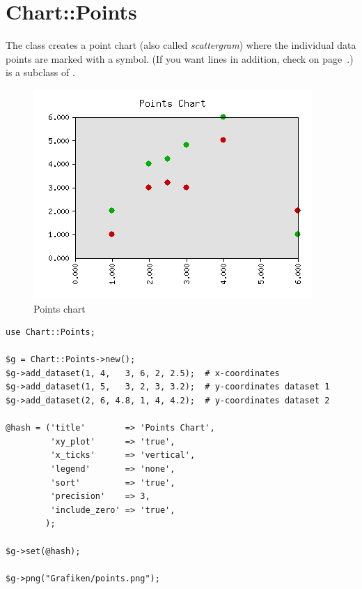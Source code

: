 %
%
\renewcommand{\thisname}{Chart::Points}
\section{\thisname}
\name{\thisname}
\begin{Description}
The class \thisclass creates a point chart (also called
\emph{scattergram}) where the individual data points are marked with a
symbol. (If you want lines in addition, check
 on page~\pageref{Chart::LinesPoints}.)
\thisclass is a subclass of .
\end{Description}

\example
\begin{figure}[ht]
  \begin{center}
    \includegraphics[scale=0.5]{points.png}
  \end{center}
  \caption{Points chart}
  \label{fig:points}
\end{figure}
\begin{verbatim}
use Chart::Points;

$g = Chart::Points->new();
$g->add_dataset(1, 4,   3, 6, 2, 2.5);  # x-coordinates
$g->add_dataset(1, 5,   3, 2, 3, 3.2);  # y-coordinates dataset 1
$g->add_dataset(2, 6, 4.8, 1, 4, 4.2);  # y-coordinates dataset 2

@hash = ('title'        => 'Points Chart',
         'xy_plot'      => 'true',
         'x_ticks'      => 'vertical',
         'legend'       => 'none',
         'sort'         => 'true',
         'precision'    => 3,
         'include_zero' => 'true',
        );

$g->set(@hash);

$g->png("Grafiken/points.png");
\end{verbatim}

